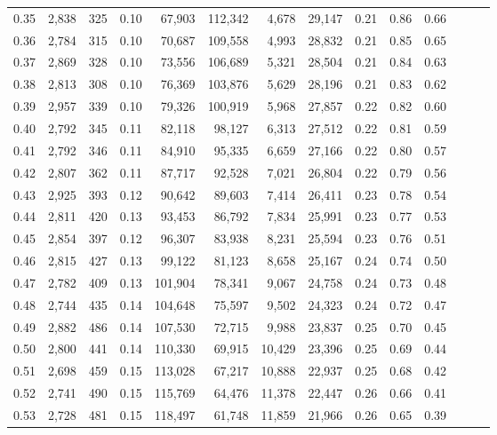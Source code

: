 \begin{tabular}{rrrrrrrrrrrrrr}
0.35 &  2,838 &  325 &  0.10 &   67,903 &  112,342 &   4,678 &  29,147 &  0.21 &  0.86 &      0.66 \\
0.36 &  2,784 &  315 &  0.10 &   70,687 &  109,558 &   4,993 &  28,832 &  0.21 &  0.85 &      0.65 \\
0.37 &  2,869 &  328 &  0.10 &   73,556 &  106,689 &   5,321 &  28,504 &  0.21 &  0.84 &      0.63 \\
0.38 &  2,813 &  308 &  0.10 &   76,369 &  103,876 &   5,629 &  28,196 &  0.21 &  0.83 &      0.62 \\
0.39 &  2,957 &  339 &  0.10 &   79,326 &  100,919 &   5,968 &  27,857 &  0.22 &  0.82 &      0.60 \\
0.40 &  2,792 &  345 &  0.11 &   82,118 &   98,127 &   6,313 &  27,512 &  0.22 &  0.81 &      0.59 \\
0.41 &  2,792 &  346 &  0.11 &   84,910 &   95,335 &   6,659 &  27,166 &  0.22 &  0.80 &      0.57 \\
0.42 &  2,807 &  362 &  0.11 &   87,717 &   92,528 &   7,021 &  26,804 &  0.22 &  0.79 &      0.56 \\
0.43 &  2,925 &  393 &  0.12 &   90,642 &   89,603 &   7,414 &  26,411 &  0.23 &  0.78 &      0.54 \\
0.44 &  2,811 &  420 &  0.13 &   93,453 &   86,792 &   7,834 &  25,991 &  0.23 &  0.77 &      0.53 \\
0.45 &  2,854 &  397 &  0.12 &   96,307 &   83,938 &   8,231 &  25,594 &  0.23 &  0.76 &      0.51 \\
0.46 &  2,815 &  427 &  0.13 &   99,122 &   81,123 &   8,658 &  25,167 &  0.24 &  0.74 &      0.50 \\
0.47 &  2,782 &  409 &  0.13 &  101,904 &   78,341 &   9,067 &  24,758 &  0.24 &  0.73 &      0.48 \\
0.48 &  2,744 &  435 &  0.14 &  104,648 &   75,597 &   9,502 &  24,323 &  0.24 &  0.72 &      0.47 \\
0.49 &  2,882 &  486 &  0.14 &  107,530 &   72,715 &   9,988 &  23,837 &  0.25 &  0.70 &      0.45 \\
0.50 &  2,800 &  441 &  0.14 &  110,330 &   69,915 &  10,429 &  23,396 &  0.25 &  0.69 &      0.44 \\
0.51 &  2,698 &  459 &  0.15 &  113,028 &   67,217 &  10,888 &  22,937 &  0.25 &  0.68 &      0.42 \\
0.52 &  2,741 &  490 &  0.15 &  115,769 &   64,476 &  11,378 &  22,447 &  0.26 &  0.66 &      0.41 \\
0.53 &  2,728 &  481 &  0.15 &  118,497 &   61,748 &  11,859 &  21,966 &  0.26 &  0.65 &      0.39 \\

\end{tabular}
